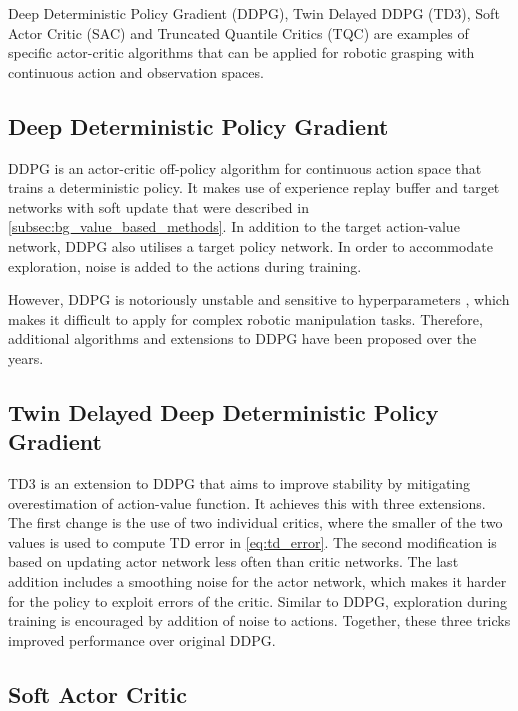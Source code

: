 Deep Deterministic Policy Gradient (DDPG), Twin Delayed DDPG (TD3), Soft Actor Critic (SAC) and Truncated Quantile Critics (TQC) are examples of specific actor-critic algorithms that can be applied for robotic grasping with continuous action and observation spaces.


\subsection{Deep Deterministic Policy Gradient}

DDPG \cite{lillicrap_continuous_2015} is an actor-critic off-policy algorithm for continuous action space that trains a deterministic policy. It makes use of experience replay buffer and target networks with soft update that were described in \autoref{subsec:bg_value_based_methods}. In addition to the target action-value network, DDPG also utilises a target policy network. In order to accommodate exploration, noise is added to the actions during training.

However, DDPG is notoriously unstable and sensitive to hyperparameters \cite{islam_reproducibility_2017, quillen_deep_2018}, which makes it difficult to apply for complex robotic manipulation tasks. Therefore, additional algorithms and extensions to DDPG have been proposed over the years.


\subsection{Twin Delayed Deep Deterministic Policy Gradient}

TD3 \cite{fujimoto_addressing_2018} is an extension to DDPG that aims to improve stability by mitigating overestimation of action-value function. It achieves this with three extensions. The first change is the use of two individual critics, where the smaller of the two values is used to compute TD error in \autoref{eq:td_error}. The second modification is based on updating actor network less often than critic networks. The last addition includes a smoothing noise for the actor network, which makes it harder for the policy to exploit errors of the critic. Similar to DDPG, exploration during training is encouraged by addition of noise to actions. Together, these three tricks improved performance over original DDPG.


\subsection{Soft Actor Critic}

